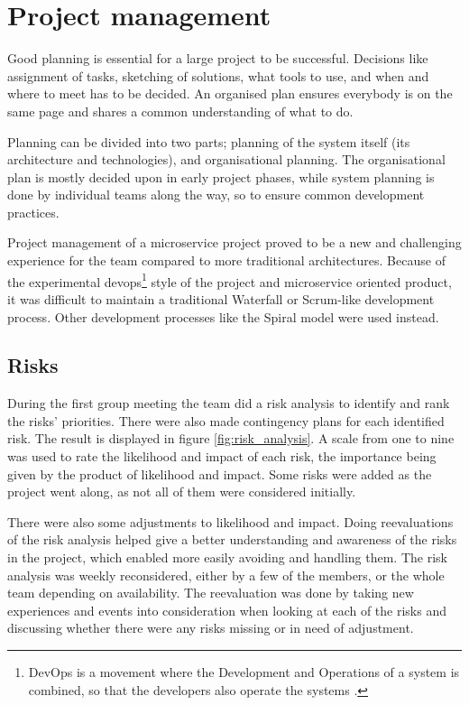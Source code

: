 \chapter{Project management}
\label{chapterProjectManagement}
\label{chapterPlanning}

Good planning is essential for a large project to be successful. Decisions like assignment of tasks, sketching of solutions, what tools to use, and when and where to meet has to be decided. An organised plan ensures everybody is on the same page and shares a common understanding of what to do.

Planning can be divided into two parts; planning of the system itself (its architecture and technologies), and organisational planning. The organisational plan is mostly decided upon in early project phases, while system planning is done by individual teams along the way, so to ensure common development practices. 

Project management of a microservice project proved to be a new and challenging experience for the team compared to more traditional architectures. Because of the experimental \acrshort{devops}\footnote{DevOps is a movement where the Development and Operations of a system is combined, so that the developers also operate the systems \citep{whatIsDevOps}.} style of the project and microservice oriented product, it was difficult to maintain a traditional Waterfall or Scrum-like development process. Other development processes like the Spiral model were used instead.

\section{Risks}
\label{section:risks}
During the first group meeting the team did a risk analysis to identify and rank the risks' priorities. There were also made contingency plans for each identified risk. The result is displayed in figure \ref{fig:risk_analysis}. A scale from one to nine was used to rate the likelihood and impact of each risk, the importance being given by the product of likelihood and impact. Some risks were added as the project went along, as not all of them were considered initially. 

There were also some adjustments to likelihood and impact. Doing reevaluations of the risk analysis helped give a better understanding and awareness of the risks in the project, which enabled more easily avoiding and handling them. The risk analysis was weekly reconsidered, either by a few of the members, or the whole team depending on availability. The reevaluation was done by taking new experiences and events into consideration when looking at each of the risks and discussing whether there were any risks missing or in need of adjustment.

